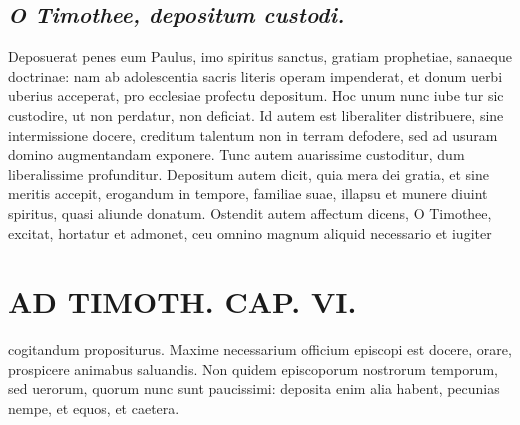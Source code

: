 \documentclass{article}
\begin{document}
\begin{pages}
{}
\subsection*{\textit{O Timothee, depositum custodi. }}\pstart Deposuerat penes eum Paulus, imo spiritus sanctus, gratiam prophetiae, sanaeque doctrinae: nam ab adolescentia sacris literis operam impenderat, et donum uerbi uberius acceperat, pro ecclesiae profectu depositum. Hoc unum nunc iube tur sic custodire, ut non perdatur, non deficiat. Id autem est liberaliter distribuere, sine intermissione docere, creditum talentum non in terram defodere, sed ad usuram domino augmentandam exponere. Tunc autem auarissime custoditur, dum liberalissime profunditur. Depositum autem dicit, quia mera dei gratia, et sine meritis accepit, erogandum in tempore, familiae suae, illapsu et munere diuint spiritus, quasi aliunde donatum. Ostendit autem affectum dicens, O Timothee, excitat, hortatur et admonet, ceu omnino magnum aliquid necessario et iugiter  \pend
\section*{AD TIMOTH. CAP. VI. }
\marginpar{[ p.543 ]}\pstart cogitandum propositurus. Maxime necessarium officium episcopi est docere, orare, prospicere animabus saluandis. Non quidem episcoporum nostrorum temporum, sed uerorum, quorum nunc sunt paucissimi: deposita enim alia habent, pecunias nempe, et equos, et caetera.  \pend
{}
{}

\end{pages}
\end{document}

